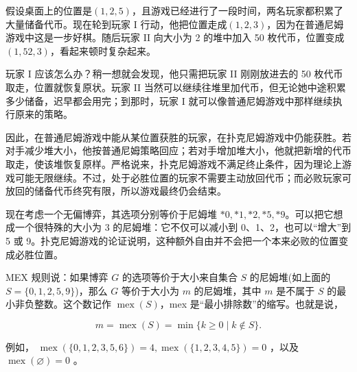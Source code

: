 假设桌面上的位置是$(1,2,5)$，且游戏已经进行了一段时间，两名玩家都积累了大量储备代币。现在轮到玩家 I 行动，他把位置走成$(1,2,3)$，因为在普通尼姆游戏中这是一步好棋。随后玩家 II 向大小为 2 的堆中加入 50 枚代币，位置变成$(1,52,3)$，看起来顿时复杂起来。

玩家 I 应该怎么办？稍一想就会发现，他只需把玩家 II 刚刚放进去的 50 枚代币取走，位置就恢复原状。玩家 II 当然可以继续往堆里加代币，但无论她中途积累多少储备，迟早都会用完；到那时，玩家 I 就可以像普通尼姆游戏中那样继续执行原来的策略。

因此，在普通尼姆游戏中能从某位置获胜的玩家，在扑克尼姆游戏中仍能获胜。若对手减少堆大小，他按普通尼姆策略回应；若对手增加堆大小，他就把新增的代币取走，使该堆恢复原样。严格说来，扑克尼姆游戏不满足终止条件，因为理论上游戏可能无限继续。不过，处于必胜位置的玩家不需要主动放回代币；而必败玩家可放回的储备代币终究有限，所以游戏最终仍会结束。

现在考虑一个无偏博弈，其选项分别等价于尼姆堆 \(*0,*1,*2,*5,*9\)。可以把它想成一个很特殊的大小为 3 的尼姆堆：它不仅可以减小到 0、1、2，也可以“增大”到 5 或 9。扑克尼姆游戏的论证说明，这种额外自由并不会把一个本来必败的位置变成必胜位置。

MEX 规则说：如果博弈 \(G\) 的选项等价于大小来自集合 \(S\) 的尼姆堆(如上面的 \(S=\{0,1,2,5,9\}\))，那么 \(G\) 等价于大小为 \(m\) 的尼姆堆，其中 \(m\) 是不属于 \(S\) 的最小非负整数。这个数记作 \(\operatorname{mex}(S)\)，mex 是“最小排除数”的缩写。也就是说，

\[
m = \operatorname{mex}\left( S\right)  = \min \{ k \geq  0 \mid  k \notin  S\} .
\]

例如， \(\operatorname{mex}\left( {\{ 0,1,2,3,5,6\} }\right)  = 4,\operatorname{mex}\left( {\{ 1,2,3,4,5\} }\right)  = 0\) ，以及 \(\operatorname{mex}\left( \varnothing \right)  = 0\) 。

